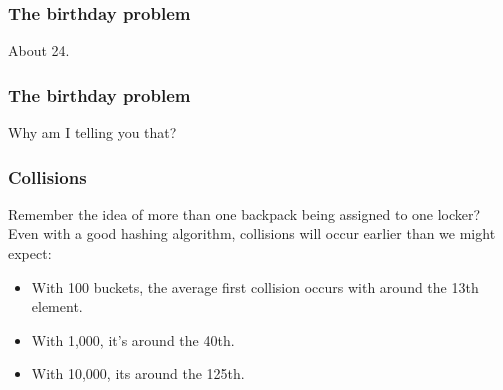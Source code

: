 \documentclass{beamer}
\begin{document}
\begin{frame}
    \frametitle{The birthday problem}

    About 24.
\end{frame}

\begin{frame}
    \frametitle{The birthday problem}

    Why am I telling you that?
\end{frame}

\begin{frame}
    \frametitle{Collisions}
    Remember the idea of more than one backpack being assigned to one locker?
    Even with a good hashing algorithm, collisions will occur earlier than we
    might expect:

    \begin{itemize}
        \item With 100 buckets, the average first collision occurs with
              around the 13th element.
        \item With 1,000, it's around the 40th. 
        \item With 10,000, its around the 125th.
    \end{itemize}
    
\end{frame}
\end{document}
